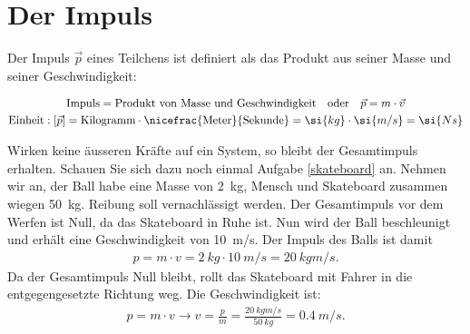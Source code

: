 \section*{Der Impuls}
Der Impuls $\vec{p}$ eines Teilchens ist definiert als das Produkt aus seiner Masse und seiner Geschwindigkeit:
\begin{cbox}
\begin{gather*}
	\text{Impuls} = \text{Produkt von Masse und Geschwindigkeit} \quad\text{oder}\quad \vec{p} = m\cdot\vec{v}\\
	\text{Einheit}: [\vec{p}]=\text{Kilogramm}\cdot\nicefrac{\text{Meter}}{\text{Sekunde}}=\si{kg}\cdot\si{m/s}=\si{N s}
\end{gather*}
\end{cbox}


Wirken keine äusseren Kräfte auf ein System, so bleibt der  Gesamtimpuls erhalten. 
Schauen Sie sich dazu noch einmal Aufgabe \ref{skateboard} an.
Nehmen wir an, der Ball habe eine Masse von \SI{2}{kg}, Mensch und Skateboard zusammen wiegen \SI{50}{kg}.
Reibung soll vernachlässigt werden.
Der Gesamtimpuls vor dem Werfen ist Null, da das Skateboard in Ruhe ist.
Nun wird der Ball beschleunigt und erhält eine Geschwindigkeit von \SI{10}{m/s}.
Der Impuls des Balls ist damit
\begin{eqnarray*}
	p=m\cdot v=\SI{2}{kg}\cdot\SI{10}{m/s}=\SI{20}{kg m/s}\text{.}
\end{eqnarray*}
Da der Gesamtimpuls Null bleibt, rollt das Skateboard mit Fahrer in die entgegengesetzte Richtung weg.
Die Geschwindigkeit ist: 
\begin{eqnarray*}
	p=m\cdot v\to v=\frac{p}{m}=\frac{\SI{20}{kg m/s}}{\SI{50}{kg}}=\SI{0.4}{m/s}\text{.}
\end{eqnarray*}
